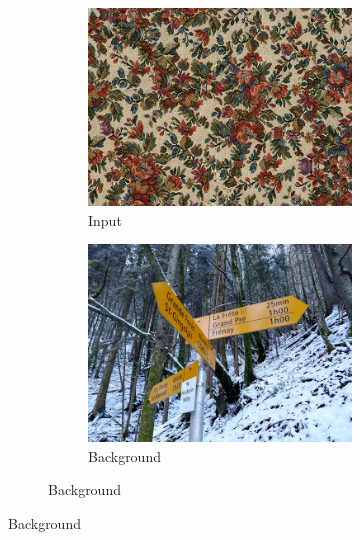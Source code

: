 \begin{figure}[]
    \centering    
    \begin{subfigure}{\textwidth}
        \centering
        \begin{subfigure}{0.24\textwidth}
            \centering
            \includegraphics[width=\textwidth]{images/04-experiment02/photo/flowers/target.jpg}
            \caption*{Input}
        \end{subfigure}
        \hfill
        \begin{subfigure}{0.24\textwidth}
            \centering
            \includegraphics[width=\textwidth]{images/04-experiment02/photo/bg.jpg}
            \caption*{Background}

\end{subfigure}
\end{subfigure}
\end{figure}
